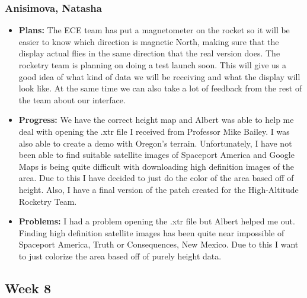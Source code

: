 \documentclass[10pt,draftclsnofoot,onecolumn]{IEEEtran}
\begin{document}
\subsubsection{Anisimova, Natasha}
\begin{itemize}
	\item \textbf{Plans: }
	The ECE team has put a magnetometer on the rocket so it will be easier to know which direction is magnetic North, making sure that the display actual flies in the same direction that the real version does. The rocketry team is planning on doing a test launch soon. This will give us a good idea of what kind of data we will be receiving and what the display will look like. At the same time we can also take a lot of feedback from the rest of the team about our interface.
	\item \textbf{Progress: }
	We have the correct height map and Albert was able to help me deal with opening the .xtr file I received from Professor Mike Bailey. I was also able to create a demo with Oregon's terrain. Unfortunately, I have not been able to find suitable satellite images of Spaceport America and Google Maps is being quite difficult with downloading high definition images of the area. Due to this I have decided to just do the color of the area based off of height. Also, I have a final version of the patch created for the High-Altitude Rocketry Team.

	\item \textbf{Problems: }
	I had a problem opening the .xtr file but Albert helped me out. Finding high definition satellite images has been quite near impossible of Spaceport America, Truth or Consequences, New Mexico. Due to this I want to just colorize the area based off of purely height data.
\end{itemize}
\subsection{Week 8}
\end{document}
